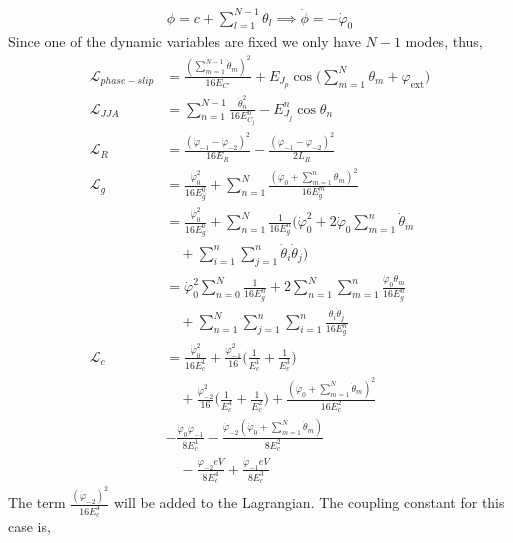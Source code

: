 \documentclass[%
reprint,
superscriptaddress,
 amsmath,amssymb,
 aps,
 prx,
longbibliography,
floatfix,
]{revtex4-2}
\begin{document}
\begin{align}
    \phi=c+\sum_{l=1}^{N-1} \theta_l\implies \dot\phi=-\dot\varphi_{0}
\end{align}
Since one of the dynamic variables are fixed we only have $N-1$ modes, thus,
  \begin{align}
    \mathcal{L}_{phase-slip}&=\frac{(\sum_{m=1}^{N-1}\dot\theta_m)^2}{16E_{C'}}+E_{J_p}\cos\big(\sum_{m=1}^N\theta_m+\varphi_\mathrm{ext}\big)\\
    \mathcal{L}_{JJA}&=\sum_{n=1}^{N-1}\frac{\dot{\theta}_n^2}{16E^{n}_{C_j}}-E^{n}_{J_j}\cos{\theta_n}\\
    \mathcal{L}_{R}&=\frac{(\dot{\varphi}_{-1}-\dot{\varphi}_{-2})^2}{16E_{{R}}}-\frac{(\varphi_{-1}-\varphi_{-2})^2}{2L_{R}}\\
    \mathcal{L}_{g}&=\frac{\dot{\varphi}_0^2}{16E^0_{g}}+\sum_{n=1}^N \frac{(\dot{\varphi_0}+\sum_{m=1}^n\dot{\theta}_m)^2}{16E^m_{g}}\\
    &=\frac{\dot{\varphi}_0^2}{16E^0_{g}}+\sum_{n=1}^N \frac{1}{16E^n_{g}}(\dot{\varphi}_0^2+2\dot{\varphi}_0\sum_{m=1}^n\dot{\theta}_m\nonumber\\&\quad+\sum_{i=1}^n\sum_{j=1}^{n}\dot{\theta}_i\dot{\theta}_j)\\
    &=\dot{\varphi}_0^2\sum_{n=0}^N\frac{1}{16E^n_g}+2\sum_{n=1}^N\sum_{m=1}^n\frac{\dot{\varphi}_0\dot{\theta}_m}{16E^n_{g}}\nonumber\\&\quad+\sum_{n=1}^N\sum_{j=1}^n\sum_{i=1}^{n}\frac{\dot{\theta}_i\dot{\theta}_j}{16E^n_{g}}\\
    \mathcal{L}_{c}&=\frac{\dot{\varphi}^2_0}{16E^1_c}+\frac{\dot{\varphi}^2_{-1}}{16}\Big(\frac{1}{E^1_c}+\frac{1}{E^3_c}\Big)\nonumber\\
    &\quad+\frac{\dot{\varphi}^2_{-2}}{16}\Big(\frac{1}{E^4_c}+\frac{1}{E^2_c}\Big)+\frac{(\dot{\varphi}_0+\sum_{m=1}^N\dot{\theta}_m)^2}{16E^2_c}\nonumber\\
  &-\frac{\dot{\varphi}_0\dot{\varphi}_{-1}}{8E^1_c}-\frac{\dot{\varphi}_{-2}(\dot{\varphi}_{0}+\sum_{m=1}^N\dot{\theta}_m)}{8E^2_c}\nonumber\\
    &\quad-\frac{\dot{\varphi}_{-2}eV}{8E^4_c}+\frac{\dot{\varphi}_{-1}eV}{8E^3_c}
\end{align}
The term $\frac{(\dot{\varphi}_{-2})^2}{16E^4_{c}}$ will be added to the Lagrangian. The coupling constant for this case is,
\end{document}
